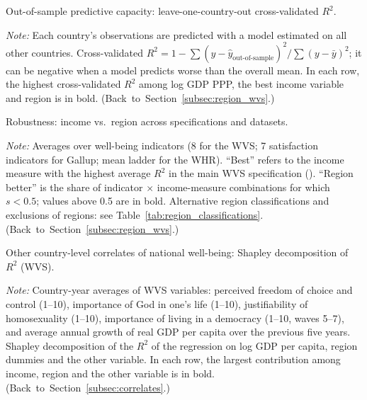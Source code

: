\documentclass[12pt]{article}
\begin{document}
\begin{table}[htbp]
    \centering
    \caption{Out-of-sample predictive capacity: leave-one-country-out cross-validated $R^2$.}\label{tab:cv}
    \begin{adjustbox}{max width=\textwidth}
    
    \end{adjustbox}
    \begin{minipage}{\textwidth}\footnotesize \textit{Note:} Each country's observations are predicted with a model estimated on all other countries. Cross-validated $R^2 = 1 - \sum (y - \hat y_{\text{out-of-sample}})^2 / \sum (y - \bar y)^2$; it can be negative when a model predicts worse than the overall mean. In each row, the highest cross-validated $R^2$ among log GDP PPP, the best income variable and region is in bold. \hfill(Back~to~Section~\ref{subsec:region_wvs}.)\end{minipage}
\end{table}

\begin{table}[htbp]
    \centering
    \caption{Robustness: income vs.\ region across specifications and datasets.}\label{tab:robustness}
    \begin{adjustbox}{max width=\textwidth}
    
    \end{adjustbox}
    \begin{minipage}{\textwidth}\footnotesize \textit{Note:} Averages over well-being indicators (8 for the WVS; 7 satisfaction indicators for Gallup; mean ladder for the WHR). ``Best'' refers to the income measure with the highest average $R^2$ in the main WVS specification (\bestIncome). ``Region better'' is the share of indicator $\times$ income-measure combinations for which $s < 0.5$; values above 0.5 are in bold. Alternative region classifications and exclusions of regions: see Table~\ref{tab:region_classifications}. \hfill(Back~to~Section~\ref{subsec:region_wvs}.)\end{minipage}
\end{table}

\begin{table}[htbp]
    \centering
    \caption{Other country-level correlates of national well-being: Shapley decomposition of $R^2$ (WVS).}\label{tab:correlates}
    \begin{adjustbox}{max width=\textwidth}
    
    \end{adjustbox}
    \begin{minipage}{\textwidth}\footnotesize \textit{Note:} Country-year averages of WVS variables: perceived freedom of choice and control (1--10), importance of God in one's life (1--10), justifiability of homosexuality (1--10), importance of living in a democracy (1--10, waves 5--7), and average annual growth of real GDP per capita over the previous five years. Shapley decomposition of the $R^2$ of the regression on log GDP per capita, region dummies and the other variable. In each row, the largest contribution among income, region and the other variable is in bold. \hfill(Back~to~Section~\ref{subsec:correlates}.)\end{minipage}
\end{table}
\end{document}
